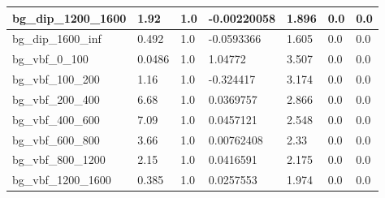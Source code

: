 \documentclass[a4paper, 10pt]{article}
\begin{document}
\begin{table}[H]
\begin{center}
\begin{tabular}{|m{23.0mm}|m{23.0mm}|m{18.0mm}|m{19.0mm}|m{19.0mm}|m{19.0mm}|m{19.0mm}|}
      \hline
      {\cellcolor{white}         bg\_dip\_1200\_1600}& {\cellcolor{white}         1.92}& {\cellcolor{white}         1.0}& {\cellcolor{white}         -0.00220058}& {\cellcolor{white}         1.896}& {\cellcolor{green}         0.0}& {\cellcolor{green}         0.0}\\
      \hline
      {\cellcolor{white}         bg\_dip\_1600\_inf}& {\cellcolor{white}         0.492}& {\cellcolor{white}         1.0}& {\cellcolor{white}         -0.0593366}& {\cellcolor{white}         1.605}& {\cellcolor{green}         0.0}& {\cellcolor{green}         0.0}\\
      \hline
      {\cellcolor{white}         bg\_vbf\_0\_100}& {\cellcolor{white}         0.0486}& {\cellcolor{white}         1.0}& {\cellcolor{white}         1.04772}& {\cellcolor{white}         3.507}& {\cellcolor{green}         0.0}& {\cellcolor{green}         0.0}\\
      \hline
      {\cellcolor{white}         bg\_vbf\_100\_200}& {\cellcolor{white}         1.16}& {\cellcolor{white}         1.0}& {\cellcolor{white}         -0.324417}& {\cellcolor{white}         3.174}& {\cellcolor{green}         0.0}& {\cellcolor{green}         0.0}\\
      \hline
      {\cellcolor{white}         bg\_vbf\_200\_400}& {\cellcolor{white}         6.68}& {\cellcolor{white}         1.0}& {\cellcolor{white}         0.0369757}& {\cellcolor{white}         2.866}& {\cellcolor{green}         0.0}& {\cellcolor{green}         0.0}\\
      \hline
      {\cellcolor{white}         bg\_vbf\_400\_600}& {\cellcolor{white}         7.09}& {\cellcolor{white}         1.0}& {\cellcolor{white}         0.0457121}& {\cellcolor{white}         2.548}& {\cellcolor{green}         0.0}& {\cellcolor{green}         0.0}\\
      \hline
      {\cellcolor{white}         bg\_vbf\_600\_800}& {\cellcolor{white}         3.66}& {\cellcolor{white}         1.0}& {\cellcolor{white}         0.00762408}& {\cellcolor{white}         2.33}& {\cellcolor{green}         0.0}& {\cellcolor{green}         0.0}\\
      \hline
      {\cellcolor{white}         bg\_vbf\_800\_1200}& {\cellcolor{white}         2.15}& {\cellcolor{white}         1.0}& {\cellcolor{white}         0.0416591}& {\cellcolor{white}         2.175}& {\cellcolor{green}         0.0}& {\cellcolor{green}         0.0}\\
      \hline
      {\cellcolor{white}         bg\_vbf\_1200\_1600}& {\cellcolor{white}         0.385}& {\cellcolor{white}         1.0}& {\cellcolor{white}         0.0257553}& {\cellcolor{white}         1.974}& {\cellcolor{green}         0.0}& {\cellcolor{green}         0.0}\\

\end{tabular}
\end{center}
\end{table}
\end{document}
